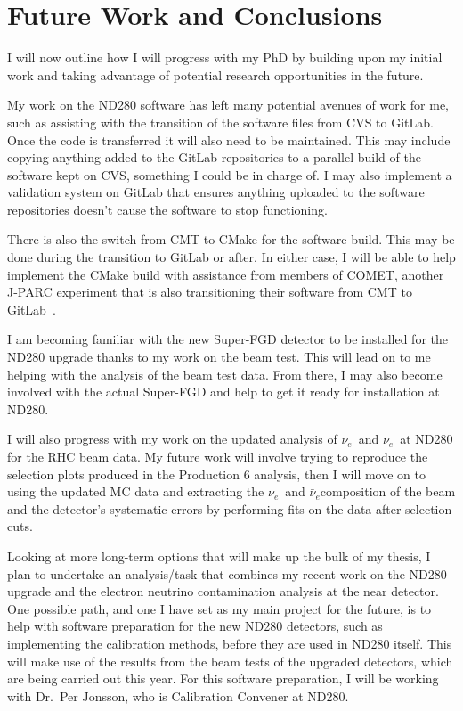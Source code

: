 \documentclass[aps,pra,12pt,notitlepage,tightenlines]{revtex4-1}
\newcommand{\nue}{$\nu_e$}
\newcommand{\anue}{$\bar\nu_e$}
\begin{document}
\section{Future Work and Conclusions}
I will now outline how I will progress with my PhD by building upon my initial work and taking advantage of potential research opportunities in the future.

My work on the ND280 software has left many potential avenues of work for me, such as assisting with the transition of the software files from CVS to GitLab. Once the code is transferred it will also need to be maintained. This may include copying anything added to the GitLab repositories to a parallel build of the software kept on CVS, something I could be in charge of. I may also implement a validation system on GitLab that ensures anything uploaded to the software repositories doesn't cause the software to stop functioning.

There is also the switch from CMT to CMake for the software build. This may be done during the transition to GitLab or after. In either case, I will be able to help implement the CMake build with assistance from members of COMET, another J-PARC experiment that is also transitioning their software from CMT to GitLab~\cite{Wu2017}.

I am becoming familiar with the new Super-FGD detector to be installed for the ND280 upgrade thanks to my work on the beam test. This will lead on to me helping with the analysis of the beam test data. From there, I may also become involved with the actual Super-FGD and help to get it ready for installation at ND280.

I will also progress with my work on the updated analysis of \nue \ and \anue \ at ND280 for the RHC beam data. My future work will involve trying to reproduce the selection plots produced in the Production 6 analysis, then I will move on to using the updated MC data and extracting the \nue \ and \anue composition of the beam and the detector's systematic errors by performing fits on the data after selection cuts. 

Looking at more long-term options that will make up the bulk of my thesis, I plan to undertake an analysis/task that combines my recent work on the ND280 upgrade and the electron neutrino contamination analysis at the near detector. One possible path, and one I have set as my main project for the future, is to help with software preparation for the new ND280 detectors, such as implementing the calibration methods, before they are used in ND280 itself. This will make use of the results from the beam tests of the upgraded detectors, which are being carried out this year. For this software preparation, I will be working with Dr.\ Per Jonsson, who is Calibration Convener at ND280. 
\end{document}
